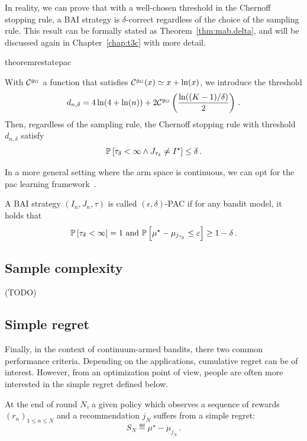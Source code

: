 In reality, we can prove that with a well-chosen threshold in the Chernoff stopping rule, a BAI strategy is $\delta$-correct regardless of the choice of the sampling rule. This result can be formally stated as Theorem~\ref{thm:mab.delta}, and will be discussed again in Chapter~\ref{chap:t3c} with more detail.

\begin{restatable}{theorem}{restatepac}\label{thm:mab.delta}
\begin{leftbar}[theorembar]
With $\mathcal{C}^{g_G}$ a function that satisfies $\mathcal{C}^{g_G}(x) \simeq x+\ln(x)$, we introduce the threshold
\begin{equation}
    d_{n,\delta} = 4\ln(4+\ln(n)) + 2 \mathcal{C}^{g_G}\left(\frac{\ln((K-1)/\delta)}{2}\right)\,.\label{def:mab.threshold_d}
\end{equation}
Then, regardless of the sampling rule, the Chernoff stopping rule with threshold $d_{n,\delta}$ satisfy 
\[ 
    \mathbb{P}\left[\tau_{\delta} < \infty \wedge J_{\tau_{\delta}} \neq I^\star\right] \leq \delta\,.
\]
\end{leftbar}
\end{restatable}

In a more general setting where the arm space is continuous, we can opt for the \gls{pac} learning framework~\citep{valiant1984pac}.

\begin{definition}\label{def:mab.pac}
\begin{leftbar}[defnbar]
A BAI strategy $(I_n,J_n,\tau)$ is called $(\epsilon,\delta)$-PAC if for any bandit model, it holds that
\[
	\mathbb{P}\left[\tau_\delta < \infty\right] = 1 \text{ and } \mathbb{P}\left[\mu^\star-\mu_{j_{\tau_\delta}}\leq \varepsilon\right] \geq 1-\delta\,.
\]
\end{leftbar}
\end{definition}

\subsection{Sample complexity}\label{sec:mab.performance.sample}

(TODO)

\subsection{Simple regret}\label{sec:mab.performance.simple}

Finally, in the context of continuum-armed bandits, there two common performance criteria. Depending on the applications, cumulative regret can be of interest. However, from an optimization point of view, people are often more interested in the \gls{simple regret} defined below. 

\begin{definition}\label{def:stoch_mab.simple_regret}
\begin{leftbar}[defnbar]
	At the end of round $N$, a given policy which observes a sequence of rewards $(r_n)_{1 \leq n \leq N}$ and a recommendation $j_N$ suffers from a simple regret:
	\[
		S_N \eqdef \mu^{\star} - \mu_{j_N}\,.
	\]
\end{leftbar}
\end{definition}
